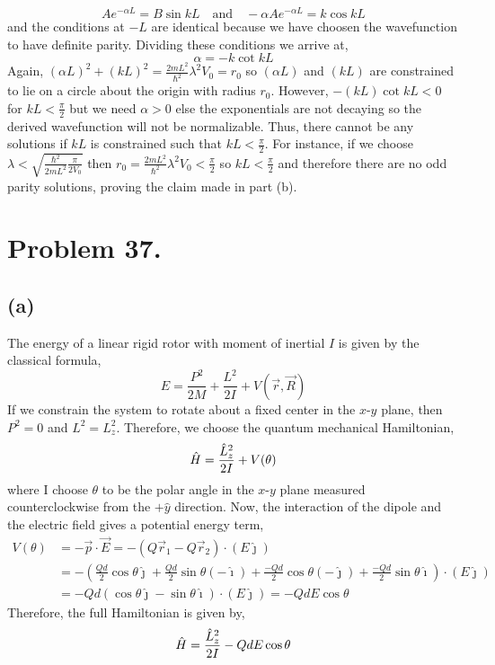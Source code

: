 \documentclass[12pt]{extarticle}
\begin{document}
\[ A e^{-\alpha L} = B \sin{k L} \quad \text{and} \quad -\alpha A e^{-\alpha L} = k \cos{k L} \] 
and the conditions at $-L$ are identical because we have choosen the wavefunction to have definite parity. Dividing these conditions we arrive at,
\[ \alpha = - k \cot{kL} \] 
Again, $(\alpha L)^2 + (kL)^2 = \frac{2m L^2}{\hbar^2} \lambda^2 V_0 = r_0$ so $(
\alpha L)$ and $(k L)$ are constrained to lie on a circle about the origin with radius $r_0$. However, $-(k L) \cot{kL} < 0$ for $kL < \frac{\pi}{2}$ but we need $\alpha > 0$ else the exponentials are not decaying so the derived wavefunction will not be normalizable. Thus, there cannot be any solutions if $kL$ is constrained such that $kL < \frac{\pi}{2}$. For instance, if we choose $\lambda < \sqrt{\frac{\hbar^2}{2mL^2} \frac{\pi}{2V_0}}$ then $r_0 = \frac{2m L^2}{\hbar^2} \lambda^2 V_0 < \frac{\pi}{2}$ so $kL < \frac{\pi}{2}$ and therefore there are no odd parity solutions, proving the claim made in part (b). 
 
\section*{Problem 37.}

\subsection*{(a)}
The energy of a linear rigid rotor with moment of inertial $I$ is given by the classical formula,
\[E = \frac{P^2}{2M} + \frac{L^2}{2I} + V(\vec{r}, \vec{R})\]
If we constrain the system to rotate about a fixed center in the $x$-$y$ plane, then $P^2 = 0$ and $L^2 = L_z^2$. Therefore, we choose the quantum mechanical Hamiltonian,
\[\hat{H} = \frac{\hat{L}_z^2}{2I} + V(\theta)\]
where I choose $\theta$ to be the polar angle in the $x$-$y$ plane measured counterclockwise from the $+\hat{y}$ direction. Now, the interaction of the dipole and the electric field gives a potential energy term,
\begin{align*} V(\theta) & = - \vec{p} \cdot \vec{E} = - (Q\vec{r}_1 - Q \vec{r}_2) \cdot (E \hat{\jmath}) \\ & = - \left(\frac{Qd}{2} \cos{\theta} \hat{\jmath} + \frac{Qd}{2} \sin{\theta} (-\hat{\imath}) + \frac{-Qd}{2} \cos{\theta} (-\hat{\jmath}) + \frac{-Qd}{2} \sin{\theta} \hat{\imath}  \right) \cdot (E \hat{\jmath}) \\
& = - Qd \left( \cos{\theta} \hat{\jmath} - \sin{\theta} \hat{\imath} \right) \cdot (E \hat{\jmath}) = - QdE \cos{\theta}
\end{align*}
Therefore, the full Hamiltonian is given by,
\[\hat{H} = \frac{\hat{L}_z^2}{2I} - QdE \cos{\theta}\]
\end{document}
